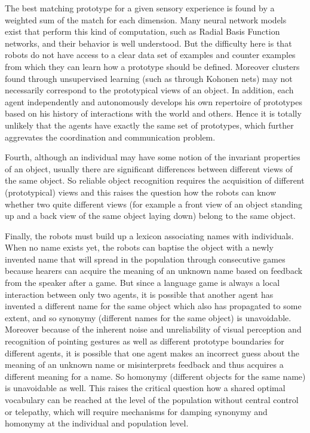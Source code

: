 The best matching prototype for a given sensory experience is  
found by a weighted sum of the match for each dimension. Many neural network models exist that perform this kind
of computation, such as Radial Basis Function networks, and their behavior is well
understood. But the difficulty here is that robots do not have access
to a clear data set of examples and counter examples from which they
can learn how a prototype should be defined. Moreover clusters found
through unsupervised learning (such as through Kohonen
nets) may not necessarily correspond to the prototypical
views of an object. In addition, each agent independently and autonomously
develops his own repertoire of prototypes based on his history of
interactions with the world and others. Hence it is totally unlikely
that the agents have exactly the same set of prototypes, which
further aggrevates the coordination and communication problem. 

Fourth, although an individual may have some notion of the invariant properties
of an object, usually
there are significant differences between different views of the same
object. So reliable object recognition requires the acquisition of
different (prototypical) views and this raises the question how the
robots can know whether two quite different views (for example a front
view of an object standing up and a back view of the same object
laying down) belong to the same object. 

Finally, the robots must build up a lexicon associating names with individuals. When no name
exists yet, the robots can baptise the object with a newly invented name that
will spread in the population through consecutive games because
hearers can acquire the meaning of an unknown name based on feedback
from the speaker after a game. But since a language game is always a
local interaction between only two agents, it is possible that another
agent has invented a different name for the same object which also has
propagated to some extent, and so synonymy (different names for the
same object) is unavoidable. Moreover because of the inherent noise
and unreliability of visual perception and recognition of pointing
gestures as well as different prototype boundaries for different
agents, it is possible that one agent makes an incorrect guess about
the meaning of an unknown name or misinterprets feedback and thus
acquires a different meaning for a name. So homonymy (different
objects for the same name) is unavoidable as well. This raises the
critical question how a shared optimal vocabulary can be reached at
the level of the population without central control or telepathy,
which will require mechanisms for damping synonymy and homonymy at the
individual and population level.\\

